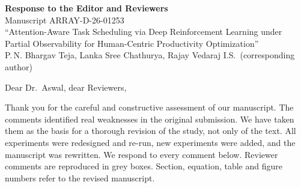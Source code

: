 \documentclass[11pt]{article}
\begin{document}
\begin{center}
{\Large\bfseries Response to the Editor and Reviewers}\\[6pt]
Manuscript ARRAY-D-26-01253\\
``Attention-Aware Task Scheduling via Deep Reinforcement Learning under Partial Observability for Human-Centric Productivity Optimization''\\[4pt]
P.\,N. Bhargav Teja, Lanka Sree Chathurya, Rajay Vedaraj I.S.\ (corresponding author)
\end{center}

\bigskip
\noindent Dear Dr.\ Aswal, dear Reviewers,

\noindent Thank you for the careful and constructive assessment of our manuscript. The comments identified real weaknesses in the original submission. We have taken them as the basis for a thorough revision of the study, not only of the text. All experiments were redesigned and re-run, new experiments were added, and the manuscript was rewritten. We respond to every comment below. Reviewer comments are reproduced in grey boxes. Section, equation, table and figure numbers refer to the revised manuscript.
\end{document}
